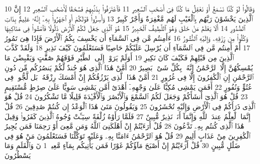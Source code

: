 {\tiny\colorbox{cl_aya}{10}} وَقَالُوا۟ لَوْ كُنَّا نَسْمَعُ أَوْ نَعْقِلُ مَا كُنَّا فِىٓ أَصْحَٰبِ ٱلسَّعِيرِ
{\tiny\colorbox{cl_aya}{11}} فَٱعْتَرَفُوا۟ بِذَنۢبِهِمْ فَسُحْقًا لِّأَصْحَٰبِ ٱلسَّعِيرِ
{\tiny\colorbox{cl_aya}{12}} إِنَّ ٱلَّذِينَ يَخْشَوْنَ رَبَّهُم بِٱلْغَيْبِ لَهُم مَّغْفِرَةٌ وَأَجْرٌ كَبِيرٌ
{\tiny\colorbox{cl_aya}{13}} وَأَسِرُّوا۟ قَوْلَكُمْ أَوِ ٱجْهَرُوا۟ بِهِۦٓ إِنَّهُۥ عَلِيمٌۢ بِذَاتِ ٱلصُّدُورِ
{\tiny\colorbox{cl_aya}{14}} أَلَا يَعْلَمُ مَنْ خَلَقَ وَهُوَ ٱللَّطِيفُ ٱلْخَبِيرُ
{\tiny\colorbox{cl_aya}{15}} هُوَ ٱلَّذِى جَعَلَ لَكُمُ ٱلْأَرْضَ ذَلُولًا فَٱمْشُوا۟ فِى مَنَاكِبِهَا وَكُلُوا۟ مِن رِّزْقِهِۦ وَإِلَيْهِ ٱلنُّشُورُ
{\tiny\colorbox{cl_aya}{16}} ءَأَمِنتُم مَّن فِى ٱلسَّمَآءِ أَن يَخْسِفَ بِكُمُ ٱلْأَرْضَ فَإِذَا هِىَ تَمُورُ
{\tiny\colorbox{cl_aya}{17}} أَمْ أَمِنتُم مَّن فِى ٱلسَّمَآءِ أَن يُرْسِلَ عَلَيْكُمْ حَاصِبًا فَسَتَعْلَمُونَ كَيْفَ نَذِيرِ
{\tiny\colorbox{cl_aya}{18}} وَلَقَدْ كَذَّبَ ٱلَّذِينَ مِن قَبْلِهِمْ فَكَيْفَ كَانَ نَكِيرِ
{\tiny\colorbox{cl_aya}{19}} أَوَلَمْ يَرَوْا۟ إِلَى ٱلطَّيْرِ فَوْقَهُمْ صَٰٓفَّٰتٍ وَيَقْبِضْنَ مَا يُمْسِكُهُنَّ إِلَّا ٱلرَّحْمَٰنُ إِنَّهُۥ بِكُلِّ شَىْءٍۭ بَصِيرٌ
{\tiny\colorbox{cl_aya}{20}} أَمَّنْ هَٰذَا ٱلَّذِى هُوَ جُندٌ لَّكُمْ يَنصُرُكُم مِّن دُونِ ٱلرَّحْمَٰنِ إِنِ ٱلْكَٰفِرُونَ إِلَّا فِى غُرُورٍ
{\tiny\colorbox{cl_aya}{21}} أَمَّنْ هَٰذَا ٱلَّذِى يَرْزُقُكُمْ إِنْ أَمْسَكَ رِزْقَهُۥ بَل لَّجُّوا۟ فِى عُتُوٍّ وَنُفُورٍ
{\tiny\colorbox{cl_aya}{22}} أَفَمَن يَمْشِى مُكِبًّا عَلَىٰ وَجْهِهِۦٓ أَهْدَىٰٓ أَمَّن يَمْشِى سَوِيًّا عَلَىٰ صِرَٰطٍ مُّسْتَقِيمٍ
{\tiny\colorbox{cl_aya}{23}} قُلْ هُوَ ٱلَّذِىٓ أَنشَأَكُمْ وَجَعَلَ لَكُمُ ٱلسَّمْعَ وَٱلْأَبْصَٰرَ وَٱلْأَفْـِٔدَةَ قَلِيلًا مَّا تَشْكُرُونَ
{\tiny\colorbox{cl_aya}{24}} قُلْ هُوَ ٱلَّذِى ذَرَأَكُمْ فِى ٱلْأَرْضِ وَإِلَيْهِ تُحْشَرُونَ
{\tiny\colorbox{cl_aya}{25}} وَيَقُولُونَ مَتَىٰ هَٰذَا ٱلْوَعْدُ إِن كُنتُمْ صَٰدِقِينَ
{\tiny\colorbox{cl_aya}{26}} قُلْ إِنَّمَا ٱلْعِلْمُ عِندَ ٱللَّهِ وَإِنَّمَآ أَنَا۠ نَذِيرٌ مُّبِينٌ
{\tiny\colorbox{cl_aya}{27}} فَلَمَّا رَأَوْهُ زُلْفَةً سِيٓـَٔتْ وُجُوهُ ٱلَّذِينَ كَفَرُوا۟ وَقِيلَ هَٰذَا ٱلَّذِى كُنتُم بِهِۦ تَدَّعُونَ
{\tiny\colorbox{cl_aya}{28}} قُلْ أَرَءَيْتُمْ إِنْ أَهْلَكَنِىَ ٱللَّهُ وَمَن مَّعِىَ أَوْ رَحِمَنَا فَمَن يُجِيرُ ٱلْكَٰفِرِينَ مِنْ عَذَابٍ أَلِيمٍ
{\tiny\colorbox{cl_aya}{29}} قُلْ هُوَ ٱلرَّحْمَٰنُ ءَامَنَّا بِهِۦ وَعَلَيْهِ تَوَكَّلْنَا فَسَتَعْلَمُونَ مَنْ هُوَ فِى ضَلَٰلٍ مُّبِينٍ
{\tiny\colorbox{cl_aya}{30}} قُلْ أَرَءَيْتُمْ إِنْ أَصْبَحَ مَآؤُكُمْ غَوْرًا فَمَن يَأْتِيكُم بِمَآءٍ مَّعِينٍۭ
{\tiny\colorbox{cl_aya}{1}} نٓ وَٱلْقَلَمِ وَمَا يَسْطُرُونَ
